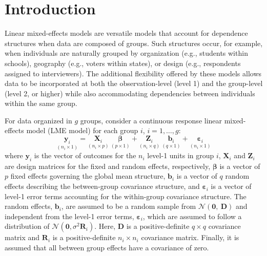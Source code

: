 \documentclass[12pt]{article} %
\newcommand{\hhnote}[1]{\todo[inline,color=orange!40]{#1}}
\begin{document}
\section{Introduction}

Linear mixed-effects models are versatile models that account for dependence structures when data are composed of groups.
Such structures occur, for example, when individuals are naturally grouped by organization (e.g., students within schools), geography (e.g., voters within states), or design (e.g., respondents assigned to  interviewers). The additional flexibility offered by these models allows data to be incorporated at both the observation-level (level 1) and the group-level (level 2, or higher) while also accommodating dependencies between individuals within the same group. 

For data organized in $g$ groups, consider a continuous response linear mixed-effects model (LME model) for each group $i$, $i=1, \ldots, g$:
%
\begin{equation}\label{eq:hlm}
	\underset{(n_i \times 1)}{\bm{y}_i} = \underset{(n_i \times p)}{\bm{X}_i} \ \underset{(p \times 1)}{\bm{\beta}} + \underset{(n_i \times q)}{\bm{Z}_i} \ \underset{(q \times 1)}{\bm{b}_i} + \underset{(n_i \times 1)}{\bm{\varepsilon}_i}
\end{equation}
%
where $\bm{y}_i$ is the vector of outcomes for the $n_i$ level-1 units in group $i$, $\bm{X}_i$ and $\bm{Z}_i$ are design matrices for the fixed and random effects, respectively, $\bm{\beta}$ is a vector of $p$ fixed effects governing the global mean structure, $\bm{b}_i$ is a vector of $q$ random effects describing the between-group covariance structure, and $\bm{\varepsilon}_i$ is a vector of level-1 error terms accounting for the within-group covariance structure. The random effects,  $\bm{b}_i$,  are assumed to be a random sample from $\mathcal{N}(\bm{0},\ \bm{D})$ and independent from the level-1 error terms,  $\bm{\varepsilon}_i$, which are assumed to follow a distribution of $\mathcal{N}(\bm{0},\sigma^2 \bm{R}_i)$. 
Here, $\bm{D}$ is a positive-definite $q \times q$ covariance matrix and $\bm{R}_i$ is a positive-definite $n_i \times n_i$ covariance matrix.
Finally, it is assumed that all between group effects have a covariance of zero.
\end{document}
